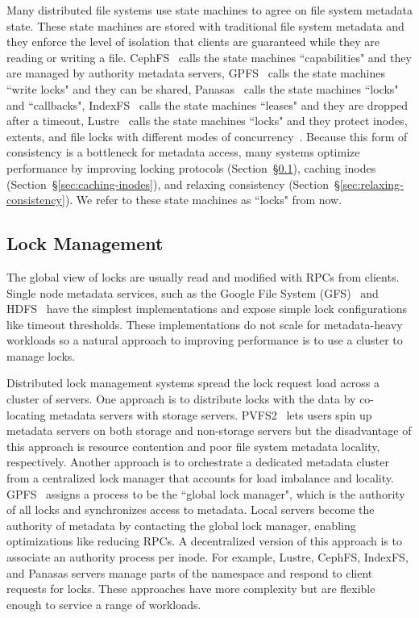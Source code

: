 Many distributed file systems use state machines to agree on file system
metadata state.  These state machines are stored with traditional file system
metadata and they enforce the level of isolation that clients are guaranteed
while they are reading or writing a file. CephFS~\cite{docs:cephcaps,
weil:phdthesis07} calls the state machines ``capabilities" and they are managed
by authority metadata servers, GPFS~\cite{schmuck:fast2002-gpfs} calls the
state machines ``write locks" and they can be shared,
Panasas~\cite{welch:fast08-panasas} calls the state machines ``locks" and
``callbacks", IndexFS~\cite{ren:sc2014-indexfs} calls the state machines
``leases" and they are dropped after a timeout,
Lustre~\cite{schwan_lustre_2003} calls the state machines ``locks" and they
protect inodes, extents, and file locks with different modes of
concurrency~\cite{wang:tech09-lustre}.  Because this form of consistency is a
bottleneck for metadata access, many systems optimize performance by improving
locking protocols (Section~\S\ref{sec:lock-management}), caching inodes
(Section~\S\ref{sec:caching-inodes}), and relaxing consistency
(Section~\S\ref{sec:relaxing-consistency}). We refer to these state machines as
``locks" from now.

\subsection{Lock Management}
\label{sec:lock-management}

The global view of locks are usually read and modified with RPCs from clients.  Single
node metadata services, such as the Google File System
(GFS)~\cite{ghemawat:sosp2003-gfs} and
HDFS~\cite{shvachko:login2012-hdfs-scalability} have the simplest
implementations and expose simple lock configurations like timeout thresholds.
These implementations do not scale for metadata-heavy workloads so a natural
approach to improving performance is to use a cluster to manage locks.

Distributed lock management systems spread the lock request load across a
cluster of servers. One approach is to distribute locks with the data by
co-locating metadata servers with storage servers.
PVFS2~\cite{devulapalli:ipdps07-pvfs2} lets users spin up metadata servers on
both storage and non-storage servers but the disadvantage of this approach is
resource contention and poor file system metadata locality, respectively.
Another approach is to orchestrate a dedicated metadata cluster from a
centralized lock manager that accounts for load imbalance and locality.
GPFS~\cite{schmuck:fast2002-gpfs} assigns a process to be the ``global lock
manager", which is the authority of all locks and synchronizes access to
metadata. Local servers become the authority of metadata by contacting the
global lock manager, enabling optimizations like reducing RPCs. A decentralized
version of this approach is to associate an authority process per inode. For
example, Lustre, CephFS, IndexFS, and Panasas servers manage parts of the
namespace and respond to client requests for locks. These approaches have more
complexity but are flexible enough to service a range of workloads.

